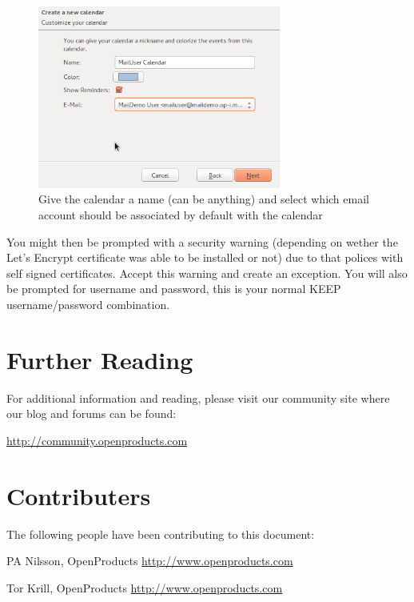 \documentclass[12pt,a4paper,titlepage]{article}
\begin{document}
\begin{figure}[h!]
\centering
\includegraphics[width=8cm]{./img/External-clients-lightning3.png}
\caption{Give the calendar a name (can be anything) and select which email account should be associated by default with the calendar}
\end{figure}
\FloatBarrier
You might then be prompted with a security warning (depending on wether the Let's Encrypt certificate was able to be installed or not) due to that polices with self signed certificates. Accept this warning and create an exception. You will also be prompted for username and password, this is your normal KEEP username/password combination.

\newpage
\section{Further Reading}
For additional information and reading, please visit our community site where our blog and forums can be found:

\href{http://community.openproducts.com}{http://community.openproducts.com}
\newpage
\section{Contributers}
The following people have been contributing to this document:
\begin{description}
\item PA Nilsson, OpenProducts \href{http://www.openproducts.com}{http://www.openproducts.com}
\item Tor Krill, OpenProducts \href{http://www.openproducts.com}{http://www.openproducts.com}
\end{description}
\end{document}
